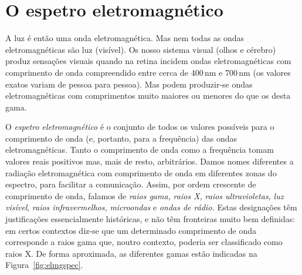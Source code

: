 \section{O espetro eletromagnético}
A luz é então uma onda eletromagnética. Mas nem todas as ondas eletromagnéticas
são luz (visível). Os nosso sistema visual (olhos e cérebro) produz sensações
visuais quando na retina incidem ondas eletromagnéticas com comprimento de onda
compreendido entre cerca de 400\,nm e 700\,nm (os valores exatos variam de
pessoa para pessoa). Mas podem produzir-se ondas eletromagnéticas com
comprimentos muito maiores ou menores do que os desta gama.

O \emph{espetro eletromagnético} é o conjunto de todos os valores possíveis para
o comprimento de onda (e, portanto, para a frequência) das ondas
eletromagnéticas. Tanto o comprimento de onda como a frequência tomam valores
reais positivos mas, mais de resto, arbitrários. Damos nomes diferentes a
radiação eletromagnética com comprimento de onda em diferentes zonas do
espectro, para facilitar a comunicação. Assim, por ordem crescente de
comprimento de onda, falamos de \emph{raios gama,} \emph{raios X,}
\emph{raios ultravioletas,} \emph{luz visível}, \emph{raios infravermelhos,}
\emph{microondas} e \emph{ondas de rádio.} Estas designações têm justificações
essencialmente históricas, e não têm fronteiras muito bem definidas: em certos
contextos diz-se que um determinado comprimento de onda corresponde a raios gama
que, noutro contexto, poderia ser classificado como raios X. De forma
aproximada, as diferentes gamas estão indicadas na Figura~\ref{fig:elmgspec}.

